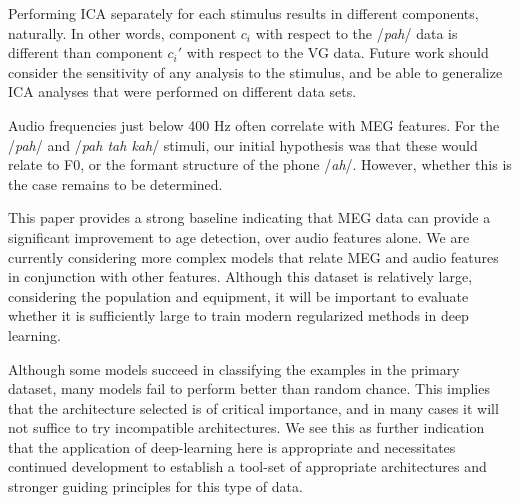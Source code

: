 \documentclass[utf8]{frontiersSCNS} %
\begin{document}
Performing ICA separately for each stimulus results in different components, naturally. In other words, component $c_i$ with respect to the /{\em pah}/ data is different than component $c_i'$ with respect to the VG data. Future work should consider the sensitivity of any analysis to the stimulus, and be able to generalize ICA analyses that were performed on different data sets.

Audio frequencies just below 400 Hz often correlate with MEG features. For the /{\em pah}/ and /{\em pah tah kah}/ stimuli, our initial hypothesis was that these would relate to F0, or the formant structure of the phone /{\em ah}/. However, whether this is the case remains to be determined.

This paper provides a strong baseline indicating that MEG data can provide a significant improvement to age detection, over audio features alone. We are currently considering more complex models that relate MEG and audio features in conjunction with other features. Although this dataset is relatively large, considering the population and equipment, it will be important to evaluate whether it is sufficiently large to train modern regularized methods in deep learning.


Although some models succeed in classifying the examples in the primary dataset, many models fail to perform better than random chance. This implies that the architecture selected is of critical importance, and in many cases it will not suffice to try incompatible architectures. We see this as further indication that the application of deep-learning here is appropriate and necessitates continued development to establish a tool-set of appropriate architectures and stronger guiding principles for this type of data.


\end{document}
